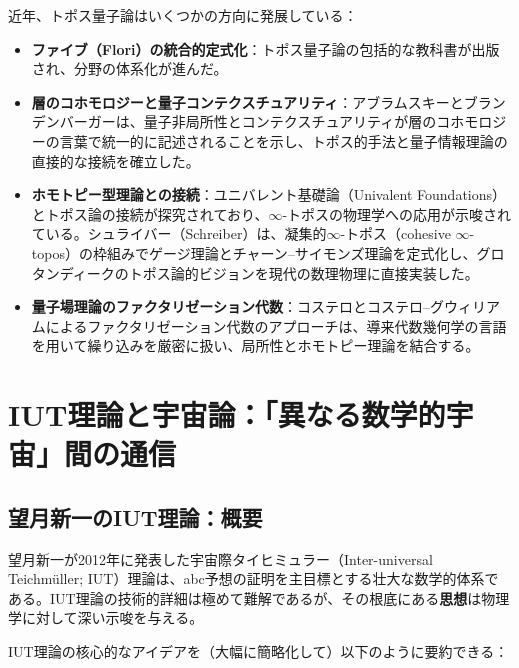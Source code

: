 \documentclass[12pt,a4paper]{ltjsarticle}
\theoremstyle{definition}
\begin{document}
近年、トポス量子論はいくつかの方向に発展している：

\begin{itemize}[leftmargin=2em]
  \item \textbf{ファイブ（Flori）の統合的定式化}：トポス量子論の包括的な教科書\cite{Flori2013}が出版され、分野の体系化が進んだ。
  \item \textbf{層のコホモロジーと量子コンテクスチュアリティ}：アブラムスキーとブランデンバーガー\cite{AbramskyBrandenburger2011}は、量子非局所性とコンテクスチュアリティが層のコホモロジーの言葉で統一的に記述されることを示し、トポス的手法と量子情報理論の直接的な接続を確立した。
  \item \textbf{ホモトピー型理論との接続}：ユニバレント基礎論（Univalent Foundations）\cite{HoTTbook2013}とトポス論の接続が探究されており、$\infty$-トポス\cite{Lurie2009}の物理学への応用が示唆されている。シュライバー（Schreiber）\cite{Schreiber2013}は、凝集的$\infty$-トポス（cohesive $\infty$-topos）の枠組みでゲージ理論とチャーン--サイモンズ理論を定式化し、グロタンディークのトポス論的ビジョンを現代の数理物理に直接実装した。
  \item \textbf{量子場理論のファクタリゼーション代数}：コステロ\cite{Costello2011}とコステロ--グウィリアム\cite{CostelloGwilliam2017}によるファクタリゼーション代数のアプローチは、導来代数幾何学の言語を用いて繰り込みを厳密に扱い、局所性とホモトピー理論を結合する。
\end{itemize}


\newpage
\section{IUT理論と宇宙論：「異なる数学的宇宙」間の通信}
\label{sec:iut}

\subsection{望月新一のIUT理論：概要}

望月新一が2012年に発表した宇宙際タイヒミュラー（Inter-universal Teich\-m\"{u}ller; IUT）理論\cite{Mochizuki2012a, Mochizuki2012b, Mochizuki2012c, Mochizuki2012d}は、abc予想の証明を主目標とする壮大な数学的体系である。IUT理論の技術的詳細は極めて難解であるが、その根底にある\textbf{思想}は物理学に対して深い示唆を与える。

IUT理論の核心的なアイデアを（大幅に簡略化して）以下のように要約できる\cite{Fesenko2015, Fesenko2016}：
\end{document}
